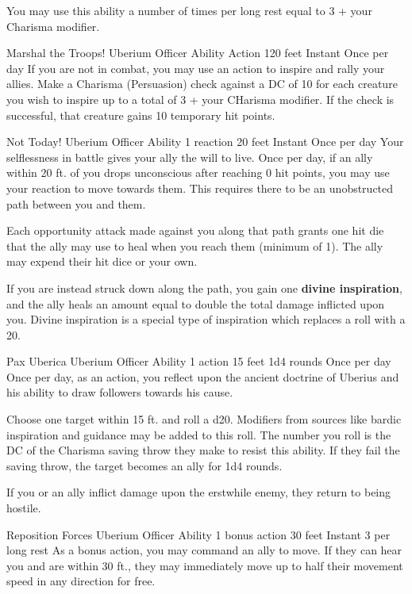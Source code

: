 You may use this ability a number of times per long rest
equal to 3 + your Charisma modifier.


\ability%
    {Marshal the Troops!}
    {Uberium Officer Ability}
    {Action}
    {120 feet}
    {Instant}
    {Once per day}
If you are not in combat,
you may use an action to inspire and rally your allies.
Make a Charisma (Persuasion) check against a DC of 10
for each creature you wish to inspire
up to a total of 3 + your CHarisma modifier.
If the check is successful,
that creature gains 10 temporary hit points.

\ability%
    {Not Today!}
    {Uberium Officer Ability}
    {1 reaction}
    {20 feet}
    {Instant}
    {Once per day}
Your selflessness in battle gives your ally the will to live.
Once per day, if an ally within 20 ft. of you drops unconscious
after reaching 0 hit points, you may use your reaction
to move towards them.
This requires there to be an unobstructed path between you and them.

Each opportunity attack made against you along that path
grants one hit die that the ally may use to heal
when you reach them (minimum of 1).
The ally may expend their hit dice or your own.

If you are instead struck down along the path,
you gain one \textbf{divine inspiration},
and the ally heals an amount equal to
double the total damage inflicted upon you.
Divine inspiration is a special type of inspiration
which replaces a roll with a 20.


\ability%
    {Pax Uberica}
    {Uberium Officer Ability}
    {1 action}
    {15 feet}
    {1d4 rounds}
    {Once per day}
Once per day, as an action,
you reflect upon the ancient doctrine of Uberius
and his ability to draw followers towards his cause.

Choose one target within 15 ft. and roll a d20.
Modifiers from sources like bardic inspiration and guidance
may be added to this roll.
The number you roll is the DC of the Charisma saving throw
they make to resist this ability.
If they fail the saving throw,
the target becomes an ally for 1d4 rounds.

If you or an ally inflict damage upon the erstwhile enemy,
they return to being hostile.


\ability%
    {Reposition Forces}
    {Uberium Officer Ability}
    {1 bonus action}
    {30 feet}
    {Instant}
    {3 per long rest}
As a bonus action, you may command an ally to move.
If they can hear you and are within 30 ft.,
they may immediately move up to half their movement speed
in any direction for free.

